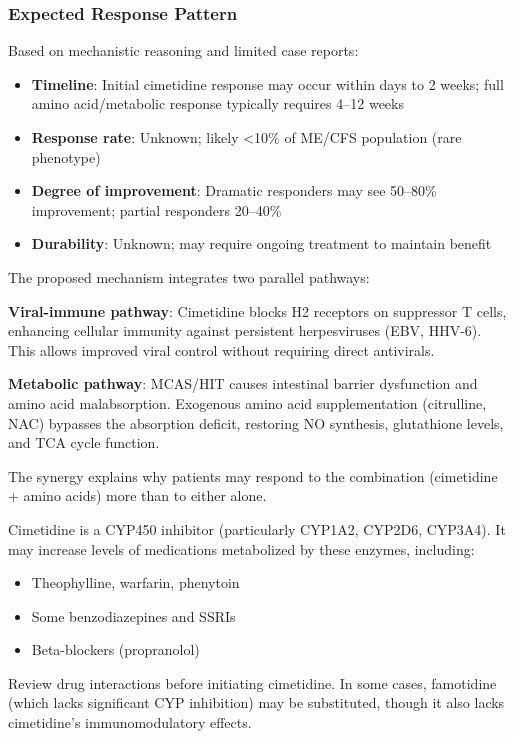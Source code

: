 \subsubsection{Expected Response Pattern}

Based on mechanistic reasoning and limited case reports:
\begin{itemize}
    \item \textbf{Timeline}: Initial cimetidine response may occur within days to 2 weeks; full amino acid/metabolic response typically requires 4--12 weeks
    \item \textbf{Response rate}: Unknown; likely <10\% of ME/CFS population (rare phenotype)
    \item \textbf{Degree of improvement}: Dramatic responders may see 50--80\% improvement; partial responders 20--40\%
    \item \textbf{Durability}: Unknown; may require ongoing treatment to maintain benefit
\end{itemize}

\begin{hypothesis}
\label{hyp:vim-mechanism}
The proposed mechanism integrates two parallel pathways:

\textbf{Viral-immune pathway}: Cimetidine blocks H2 receptors on suppressor T cells, enhancing cellular immunity against persistent herpesviruses (EBV, HHV-6). This allows improved viral control without requiring direct antivirals.

\textbf{Metabolic pathway}: MCAS/HIT causes intestinal barrier dysfunction and amino acid malabsorption. Exogenous amino acid supplementation (citrulline, NAC) bypasses the absorption deficit, restoring NO synthesis, glutathione levels, and TCA cycle function.

The synergy explains why patients may respond to the combination (cimetidine + amino acids) more than to either alone.
\end{hypothesis}

\begin{warning}
Cimetidine is a CYP450 inhibitor (particularly CYP1A2, CYP2D6, CYP3A4). It may increase levels of medications metabolized by these enzymes, including:
\begin{itemize}
    \item Theophylline, warfarin, phenytoin
    \item Some benzodiazepines and SSRIs
    \item Beta-blockers (propranolol)
\end{itemize}
Review drug interactions before initiating cimetidine. In some cases, famotidine (which lacks significant CYP inhibition) may be substituted, though it also lacks cimetidine's immunomodulatory effects.
\end{warning}

